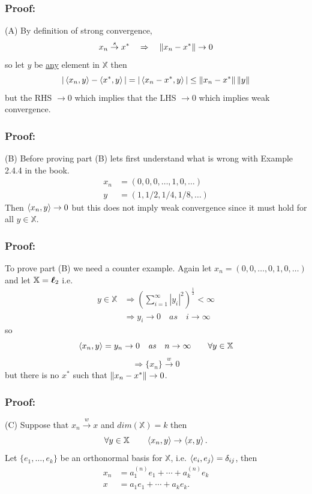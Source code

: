 \documentclass{beamer}
\begin{document}
\begin{frame}\frametitle{Proof:}
\noindent (A) By definition of strong convergence,
\[ 
x_n \overset{s}{\to} x^* \quad \Rightarrow \quad \left\| x_n-x^*\right\|  \to 0
\]
so let $y$ be \underline{any} element in $\mathbb{X}$ then
\[ 
|\left< x_n,y \right> - \left< x^*,y \right> | = |\left< x_n - x^*,y \right> | \leq \left\| x_n-x^*\right\|  \left\| y\right\|  
\]
but the RHS $\to 0$ which implies that the LHS $\to 0$ which implies weak convergence.
\end{frame}

\begin{frame}\frametitle{Proof:}
\noindent (B) Before proving part (B) lets first understand what is wrong with Example 2.4.4 in the book.
\begin{align*}
x_n &= (0,0,0,\ldots,1,0,\ldots) \\
y &= (1, 1/2, 1/4, 1/8, \ldots)
\end{align*}
Then $\left< x_n, y \right> \to 0$ but this does not imply weak convergence since it must hold for all $y \in \mathbb{X}$.
\end{frame}

\begin{frame}\frametitle{Proof:}
To prove part (B) we need a counter example.  Again let $x_n = (0,0,\ldots,0,1,0,\ldots)$ and let $\mathbb{X} = \boldsymbol{\ell}_2$ i.e. 
\begin{align*}
y \in \mathbb{X} &\Rightarrow \left( \displaystyle \sum_{i=1}^{\infty}|y_i|^2\right)^{\frac{1}{2}} < \infty \\
	&\Rightarrow y_i \to 0 \quad \mathit{as} \quad i \to \infty 
\end{align*}
so 
\[ 
\left< x_n,y \right> = y_n \to 0 \quad \mathit{as} \quad n \to \infty \qquad \forall y \in \mathbb{X}
\]
\[ 
\Rightarrow \{x_n\} \overset{w}{\to} 0 
\]
but there is no $x^*$ such that $\left\| x_n - x^*\right\| \to 0$.
\end{frame}

\begin{frame}\frametitle{Proof:}
\noindent (C) Suppose that $x_n \overset{w}{\to} x$ and $dim(\mathbb{X})=k$ then 
\[
\forall y \in \mathbb{X} \qquad \left< x_n,y \right> \to \left< x,y \right>.
\]
Let $\{e_1,\ldots,e_k\}$ be an orthonormal basis for $\mathbb{X}$, i.e. $ \left< e_i, e_j \right> = \delta_{ij}$, then 
\begin{align*}
x_n &= a_1^{(n)}e_1 + \cdots + a_k^{(n)}e_k\\
x &= a_1e_1 + \cdots + a_ke_k.
\end{align*}
\end{frame}
\end{document}
